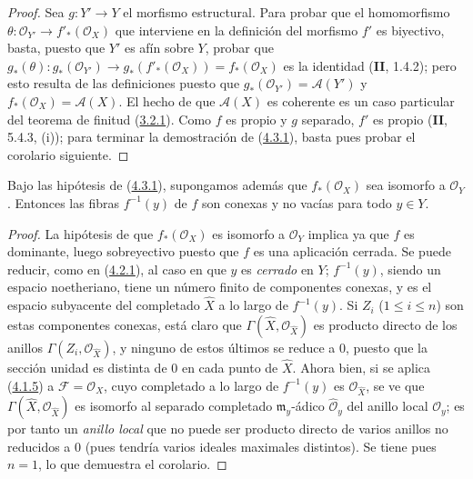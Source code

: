 \begin{proof}
Sea $g:Y'\to Y$ el morfismo estructural. Para probar que el homomorfismo
$\theta:\mathcal O_{Y'}\to f'_*(\mathcal O_X)$ que interviene en la definición
del morfismo $f'$ es biyectivo, basta, puesto que $Y'$ es afín sobre $Y$,
probar que
$g_*(\theta):g_*(\mathcal O_{Y'})\longrightarrow
g_*(f'_*(\mathcal O_X))=f_*(\mathcal O_X)$
es la identidad (\textbf{II}, 1.4.2); pero esto resulta de las definiciones puesto que
$g_*(\mathcal O_{Y'})=\mathcal A(Y')$ y
$f_*(\mathcal O_X)=\mathcal A(X)$. El hecho de que $\mathcal A(X)$ es
coherente es un caso particular del teorema de finitud
(\hyperref[III.3.2.1-fr]{3.2.1}). Como $f$ es propio y $g$ separado,
$f'$ es propio (\textbf{II}, 5.4.3, (i)); para terminar la demostración de
(\hyperref[III.4.3.1-fr]{4.3.1}), basta pues probar el corolario
siguiente.
\end{proof}

\begin{corollary}[4.3.2]
\label{III.4.3.2-fr}
Bajo las hipótesis de \textup{(\hyperref[III.4.3.1-fr]{4.3.1})}, supongamos además
que $f_*(\mathcal O_X)$ sea isomorfo a $\mathcal O_Y$. Entonces las fibras
$f^{-1}(y)$ de $f$ son conexas y no vacías para todo $y\in Y$.
\end{corollary}

\begin{proof}
La hipótesis de que $f_*(\mathcal O_X)$ es isomorfo a $\mathcal O_Y$
implica ya que $f$ es dominante, luego sobreyectivo puesto que $f$ es una
aplicación cerrada. Se puede reducir, como en
(\hyperref[III.4.2.1-fr]{4.2.1}), al caso en que $y$ es \emph{cerrado} en $Y$;
$f^{-1}(y)$, siendo un espacio noetheriano, tiene un número finito de componentes
conexas, y es el espacio subyacente del completado $\widehat X$ a lo largo de
$f^{-1}(y)$. Si $Z_i$ ($1\leq i\leq n$) son estas componentes conexas, está
claro que $\Gamma(\widehat X,\mathcal O_{\widehat X})$ es producto
directo de los anillos $\Gamma(Z_i,\mathcal O_{\widehat X})$, y ninguno de estos
últimos se reduce a $0$, puesto que la sección unidad es distinta de
$0$ en cada punto de $\widehat X$. Ahora bien, si se aplica
(\hyperref[III.4.1.5-fr]{4.1.5}) a $\mathcal F=\mathcal O_X$, cuyo
completado a lo largo de $f^{-1}(y)$ es $\mathcal O_{\widehat X}$, se ve que
$\Gamma(\widehat X,\mathcal O_{\widehat X})$ es isomorfo al separado
completado $\mathfrak m_y$-ádico $\widehat{\mathcal O}_y$ del anillo local
$\mathcal O_y$; es por tanto un \emph{anillo local} que no puede ser producto
directo de varios anillos no reducidos a $0$ (pues tendría
varios ideales maximales distintos). Se tiene pues $n=1$, lo que demuestra el
corolario.
\end{proof}

